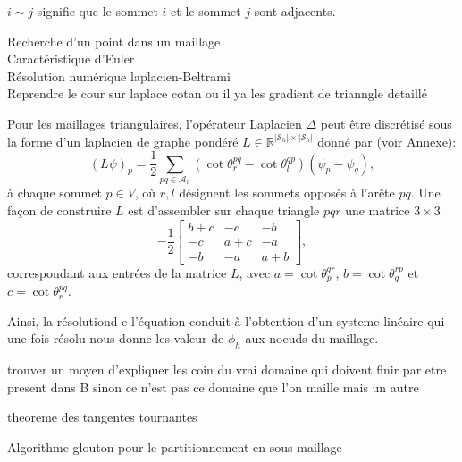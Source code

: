\(i \sim j\) signifie que le sommet \(i\) et le sommet \(j\) sont adjacents.

\newpage
Recherche d'un point dans un maillage\\
Caractéristique d'Euler\\
Résolution numérique laplacien-Beltrami\\
Reprendre le cour sur laplace cotan ou il ya les gradient de trianngle detaillé\\
\[\]

Pour les maillages triangulaires, l'opérateur Laplacien $\Delta$ peut être discrétisé sous la forme d'un laplacien de graphe pondéré $L\in\mathbb{R}^{|\mathcal{S}_h|\times|\mathcal{S}_h|}$ donné par \cite{sharp2019vector} (voir Annexe):
$$
(L\psi)_p=\frac{1}{2}\sum_{pq\in\mathcal{A}_h}(\cot\theta_r^{pq}-\cot\theta_l^{qp})(\psi_p-\psi_q),
$$
à chaque sommet $p\in V$, où $r, l$ désignent les sommets opposés à l'arête $pq$. Une façon de construire $L$ est d'assembler sur chaque triangle $pqr$ une matrice $3\times 3$
$$
-\frac{1}{2}
\begin{bmatrix}
b+c & -c & -b\\
-c & a+c & -a\\
-b & -a & a+b
\end{bmatrix},
$$
correspondant aux entrées de la matrice $L$, avec $a=\cot\theta_p^{qr}$, $b=\cot\theta_q^{rp}$ et $c=\cot\theta_r^{pq}$.

Ainsi, la résolutiond e l'équation conduit à l'obtention d'un systeme linéaire qui une fois résolu nous donne les valeur de $\phi_h$ aux noeuds du maillage.

\[\]
trouver un moyen d'expliquer les coin du vrai domaine qui doivent finir par etre present dans B sinon ce n'est pas ce domaine que l'on maille mais un autre


\[\]
theoreme des tangentes tournantes


\[\]
Algorithme glouton pour le partitionnement en sous maillage
